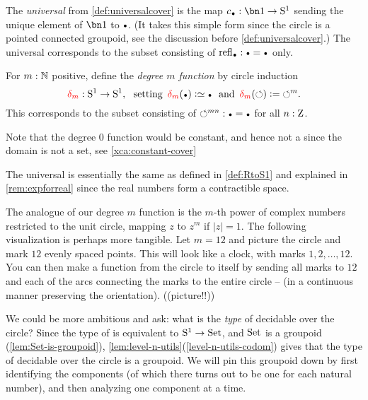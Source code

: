 \begin{example}\label{exa:univS1cover}
The \emph{universal} \covering from \cref{def:universalcover}
is the map $c_\base:\bn 1\to \Sc$ 
sending the unique element of $\bn 1$ to $\base$. 
(It takes this simple form since the circle is a pointed connected
groupoid, see the discussion before \cref{def:universalcover}.)
The universal \covering corresponds to the subset consisting 
of $\refl\base : \base=\base$ only.  
\end{example}

\begin{example}\label{exa:mfoldS1cover}
For $m:\mathbb{N}$ positive, define the \emph{degree $m$ function} by circle induction
\[
\dg{m}:\Sc\to \Sc, \text{~~setting~} 
\dg{m}(\base)\defeq\base \text{~~and~} 
\dg{m}(\Sloop)\defis{\Sloop}^m.
\]
This \covering corresponds to the subset consisting 
of ${\Sloop}^{mn} : \base=\base$ for all $n:\mathrm{Z}$.
\end{example}

Note that the degree $0$ function would be constant,
and hence not a \covering since the domain is not a set,
see \cref{xca:constant-cover}

\begin{remark}
  \label{rem:RtoS1}
The universal \covering is essentially the same as defined in \cref{def:RtoS1}
and explained in \cref{rem:expforreal}
since the real numbers form a contractible space.

\label{rem:finitecoveringsofS1}
The analogue of our degree $m$ function is the $m$-th power of complex numbers 
restricted to the unit circle, mapping $z$ to $z^m$ if $|z|=1$.  
The following visualization is perhaps more tangible.  
Let $m=12$ and picture the circle and mark $12$ evenly spaced points.
This will look like a clock, with marks $1,2,\dots,12$. 
You can then make a function from the circle to itself by sending 
all marks to $12$ and each of the arcs connecting the marks to the entire circle 
-- (in a continuous manner preserving the orientation).
  ((picture!!))
\end{remark}

We could be more ambitious and ask: what is the \emph{type} of decidable 
\coverings over the circle?  Since the type of \coverings is 
equivalent to ${\mathrm{S}^1}\to \mathrm{Set}$, and $\mathrm{Set}$ is a groupoid
(\cref{lem:Set-is-groupoid}),
\cref{lem:level-n-utils}(\ref{level-n-utils-codom}) gives
that the type of decidable \coverings over the circle is a groupoid.  
We will pin this groupoid down by first identifying the components 
(of which there turns out to be one for each natural number), 
and then analyzing one component at a time.

